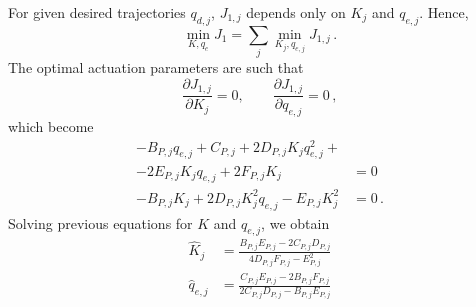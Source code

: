 For given desired trajectories $q_{d,j}$, $J_{1,j}$ depends only on $K_j$ and $q_{e,j}$. Hence,
\begin{equation*}
\min_{K,q_e}{J_1} = \sum_j{\min_{K_j,q_{e,j}}{J_{1,j}}} \,.
\end{equation*}
The optimal actuation parameters are such that
\begin{equation}
\label{eq:partialdiff}
\frac{\partial J_{1,j}}{\partial K_j} = 0,\qquad
\frac{\partial J_{1,j}}{\partial q_{e,j}} = 0\,,
\end{equation}
which become
\begin{align}
-B_{P,j} q_{e,j} + C_{P,j} +  2D_{P,j}K_j q^2_{e,j} +\nonumber\\ 
-2 E_{P,j}K_jq_{e,j} +  2 F_{P,j} K_j  &= 0\\
-B_{P,j} K_j+2 D_{P,j} K^2_jq_{e,j} - E_{P,j} K^2_j &= 0\,.
\end{align}
Solving previous equations for $K$ and $q_{e,j}$, we obtain
\begin{align}
\label{eq:optimK_PEA_J1}
  \hat{K}_j &= \frac{B_{P,j}E_{P,j}-2C_{P,j}D_{P,j}}{4D_{P,j}F_{P,j}-E^2_{P,j}}\\
\hat{q}_{e,j} &= \frac{C_{P,j}E_{P,j} - 2B_{P,j}F_{P,j}}{2C_{P,j}D_{P,j}-B_{P,j}E_{P,j}}
\label{eq:optimq_PEA_J1}
\end{align}

